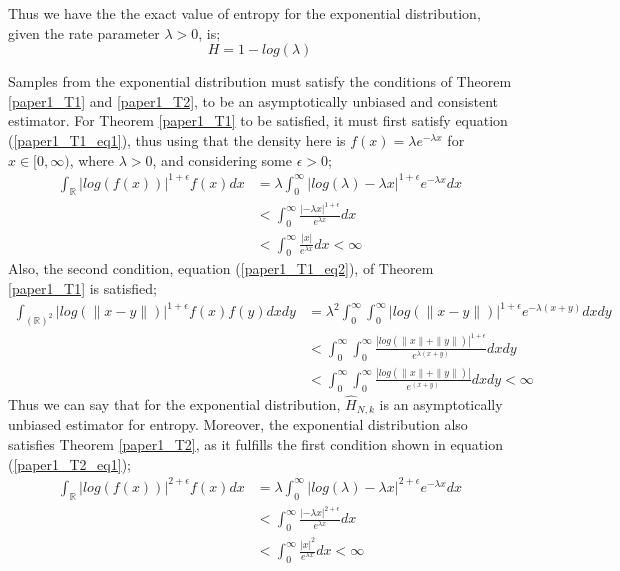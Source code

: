 \documentclass{article}
\begin{document}
Thus we have the the exact value of entropy for the exponential distribution, given the rate parameter $\lambda > 0$, is;
\begin{equation} \label{ExpEnt}
H = 1 - log(\lambda)
\end{equation}

Samples from the exponential distribution must satisfy the conditions of Theorem \ref{paper1_T1} and \ref{paper1_T2}, to  be an asymptotically unbiased and consistent estimator. For Theorem \ref{paper1_T1} to be satisfied, it must first satisfy equation (\ref{paper1_T1_eq1}), thus using that the density here is $f(x) = \lambda e^{-\lambda x}$ for $x \in [0, \infty)$, where $\lambda >0$, and considering some $\epsilon >0$;
\begin{align} \nonumber
\int_{\mathbb{R}} | log(f(x))|^{1 + \epsilon} f(x) dx  &= \lambda \int_{0}^{\infty} | log (\lambda) - \lambda x |^{1 + \epsilon} e^{- \lambda x} dx \\ \nonumber
&<  \int_{0}^{\infty} \frac{| - \lambda x |^{1 + \epsilon}}{ e^{\lambda x}} dx \\ \nonumber
&<  \int_{0}^{\infty} \frac{|x|}{ e^{\lambda x}} dx < \infty \nonumber
\end{align}
Also, the second condition, equation (\ref{paper1_T1_eq2}), of Theorem \ref{paper1_T1} is satisfied;
\begin{align} \nonumber
\int_{(\mathbb{R})^2} | log(\|x-y\|)|^{1+ \epsilon} f(x) f(y) dx dy  &= \lambda^2 \int_{0}^{\infty} \int_{0}^{\infty} | log(\|x-y\|)|^{1+ \epsilon} e^{- \lambda (x + y)} dx dy \\ \nonumber
&<  \int_{0}^{\infty} \int_{0}^{\infty}  \frac{| log(\|x\| + \|y\|)|^{1+ \epsilon}}{e^{\lambda (x + y)}} dx dy \\ \nonumber
&<  \int_{0}^{\infty} \int_{0}^{\infty}  \frac{| log(\|x\| + \|y\|)|}{e^{(x + y)}} dx dy < \infty  \nonumber
\end{align}
Thus we can say that for the exponential distribution, $\hat{H}_{N,k}$ is an asymptotically unbiased estimator for entropy. Moreover, the exponential distribution also satisfies Theorem \ref{paper1_T2}, as it fulfills the first condition shown in equation (\ref{paper1_T2_eq1});
\begin{align} \nonumber
\int_{\mathbb{R}} | log(f(x))|^{2 + \epsilon} f(x) dx  &= \lambda \int_{0}^{\infty} | log (\lambda) - \lambda x |^{2 + \epsilon} e^{- \lambda x} dx \\ \nonumber
&<  \int_{0}^{\infty} \frac{| - \lambda x |^{2 + \epsilon}}{ e^{\lambda x}} dx \\ \nonumber
&<  \int_{0}^{\infty} \frac{|x|^2}{ e^{\lambda x}} dx < \infty \nonumber
\end{align}
\end{document}
